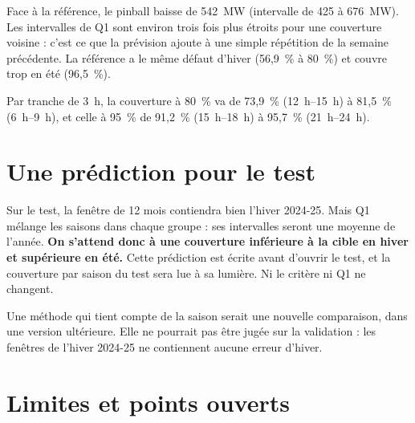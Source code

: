 \documentclass[11pt,a4paper]{article}
\begin{document}
Face à la référence, le pinball baisse de 542~MW (intervalle de 425 à 676~MW). Les intervalles de Q1 sont environ trois fois plus étroits pour une couverture voisine : c'est ce que la prévision ajoute à une simple répétition de la semaine précédente. La référence a le même défaut d'hiver (56,9~\% à 80~\%) et couvre trop en été (96,5~\%).

Par tranche de 3~h, la couverture à 80~\% va de 73,9~\% (12~h--15~h) à 81,5~\% (6~h--9~h), et celle à 95~\% de 91,2~\% (15~h--18~h) à 95,7~\% (21~h--24~h).

\section{Une prédiction pour le test}

Sur le test, la fenêtre de 12 mois contiendra bien l'hiver 2024-25. Mais Q1 mélange les saisons dans chaque groupe : ses intervalles seront une moyenne de l'année. \textbf{On s'attend donc à une couverture inférieure à la cible en hiver et supérieure en été.} Cette prédiction est écrite avant d'ouvrir le test, et la couverture par saison du test sera lue à sa lumière. Ni le critère ni Q1 ne changent.

Une méthode qui tient compte de la saison serait une nouvelle comparaison, dans une version ultérieure. Elle ne pourrait pas être jugée sur la validation : les fenêtres de l'hiver 2024-25 ne contiennent aucune erreur d'hiver.

\section{Limites et points ouverts}
\end{document}
